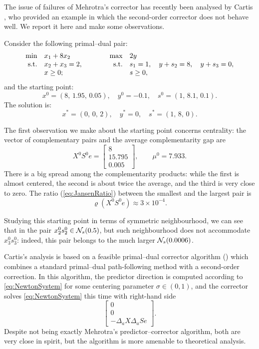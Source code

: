 The issue of failures of Mehrotra's corrector
has recently been analysed by Cartis \cite{Cartis04}, 
who provided an example in which the second-order corrector does 
not behave well. 
We report it here and make some observations.

\begin{example}  \label{ex:Coralia}
Consider the following primal--dual pair:
\[
  \begin{array}{rlp{2em}rl}
    \min        & x_1 + 8 x_2    & & \max  & 2 y \\
    \mbox{s.t.} & x_2 + x_3 = 2, & & \mbox{s.t.} & s_1 = 1,\quad
                                                   y + s_2 = 8,\quad
						   y + s_3 = 0, \\
                & x \geq 0;      & &             & s \geq 0,
  \end{array}
\]
and the starting point:
\[
  x^0 = (8,\, 1.95,\, 0.05), \quad y^0 = -0.1, \quad s^0 = (1,\, 8.1,\, 0.1).
\]
The solution is:
\[
  x^* = (0,\, 0,\, 2), \quad y^* = 0, \quad s^* = (1,\, 8,\, 0).
\]
\end{example}

The first observation we make about the starting point 
concerns centrality: the vector of complementary pairs and
the average complementarity gap are
\[
  X^0S^0e = \left[ \begin{array}{c}
            8 \\ 15.795 \\ 0.005
            \end{array} \right],
  \qquad
  \mu^0 = 7.933.
\]
There is a big spread among the
complementarity products: while the first is almost centered, the second
is about twice the average, and the third is very close to zero. 
The ratio (\ref{eq:JansenRatio}) between the smallest and the largest pair is
\[
  \varrho(X^0S^0e) \approx 3 \times 10^{-4}.
\]

Studying this starting point in terms of symmetric neighbourhood,
we can see that in the pair $x^0_2s^0_2 \in \mathcal{N}_s(0.5)$, but 
such neighbourhood does not accommodate $x^0_3s^0_3$:
indeed, this pair belongs to the much larger $\mathcal{N}_s(0.0006)$.

Cartis's analysis is based on a feasible primal--dual
corrector algorithm (\PDC)
which combines a standard primal--dual path-following method with 
a second-order correction.
In this algorithm, the predictor direction is computed according
to \eqref{eq:NewtonSystem} for some centering parameter $\sigma \in (0, 1)$,
and the corrector solves \eqref{eq:NewtonSystem} this time with
right-hand side
\[
  \left[ \begin{array}{c}
    0 \\ 0 \\ -\Delta_a X\Delta_a Se
  \end{array} \right].
\]
Despite not being exactly Mehrotra's 
predictor--corrector algorithm, both are very close in spirit,
but the \PDC algorithm is more amenable to theoretical analysis.

